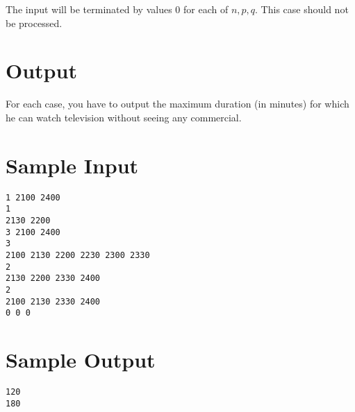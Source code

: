 \documentclass[10pt]{article}
\begin{document}
The input will be terminated by values $0$ for each of $n, p, q$. This case should not be processed.

\section*{Output}

For each case, you have to output the maximum duration (in minutes) for which he can watch television without seeing any commercial.

\section*{Sample Input}
\begin{verbatim}
1 2100 2400
1
2130 2200
3 2100 2400
3
2100 2130 2200 2230 2300 2330
2
2130 2200 2330 2400
2
2100 2130 2330 2400
0 0 0
\end{verbatim}

\section*{Sample Output}
\begin{verbatim}
120
180
\end{verbatim}
\end{document}
